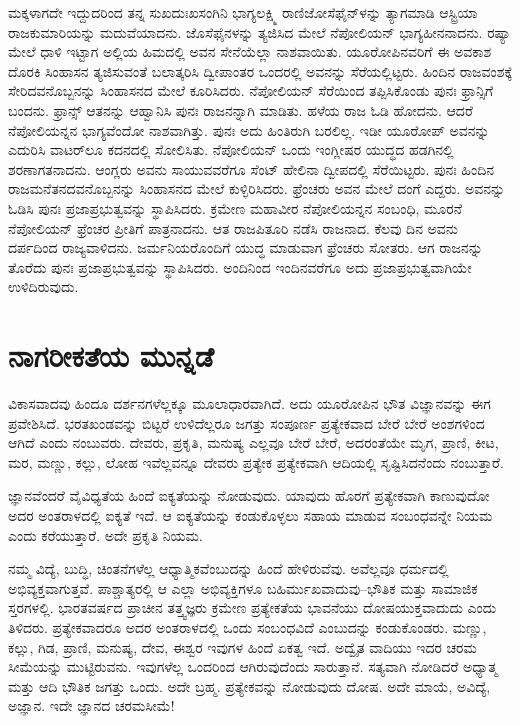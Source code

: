 ಮಕ್ಕಳಾಗದೇ ಇದ್ದುದರಿಂದ ತನ್ನ ಸುಖದುಃಖಸಂಗಿನಿ ಭಾಗ್ಯಲಕ್ಷ್ಮಿ ರಾಣಿ\break ಜೋಸೆಫೈನ್​ಳನ್ನು ತ್ಯಾಗಮಾಡಿ ಆಸ್ಟ್ರಿಯಾ ರಾಜಕುಮಾರಿಯನ್ನು ಮದುವೆಯಾದನು. ಜೊಸೆಫೈನಳನ್ನು ತ್ಯಜಿಸಿದ ಮೇಲೆ ನೆಪೋಲಿಯನ್​ ಭಾಗ್ಯಹೀನನಾದನು. ರಷ್ಯಾ ಮೇಲೆ ಧಾಳಿ ಇಟ್ಟಾಗ ಅಲ್ಲಿಯ ಹಿಮದಲ್ಲಿ ಅವನ ಸೇನೆಯೆಲ್ಲಾ ನಾಶವಾಯಿತು. ಯೂರೋಪಿ\break ನವರಿಗೆ ಈ ಅವಕಾಶ ದೊರಕಿ ಸಿಂಹಾಸನ ತ್ಯಜಿಸುವಂತೆ ಬಲಾತ್ಕರಿಸಿ ದ್ವೀಪಾಂತರ ಒಂದರಲ್ಲಿ ಅವನನ್ನು ಸೆರೆಯಲ್ಲಿಟ್ಟರು. ಹಿಂದಿನ ರಾಜವಂಶಕ್ಕೆ ಸೇರಿದವನೊಬ್ಬನನ್ನು ಸಿಂಹಾಸನದ ಮೇಲೆ ಕೂರಿಸಿದರು. ನೆಪೋಲಿಯನ್​ ಸೆರೆಯಿಂದ ತಪ್ಪಿಸಿಕೊಂಡು ಪುನಃ ಫ್ರಾನ್ಸಿಗೆ ಬಂದನು. ಫ್ರಾನ್ಸ್​ ಆತನನ್ನು ಆಹ್ವಾನಿಸಿ ಪುನಃ ರಾಜನನ್ನಾಗಿ ಮಾಡಿತು. ಹಳೆಯ ರಾಜ ಓಡಿ ಹೋದನು. ಆದರೆ ನೆಪೋಲಿಯನ್ನನ ಭಾಗ್ಯವೆಂದೋ ನಾಶವಾಗಿತ್ತು. ಪುನಃ ಅದು ಹಿಂತಿರುಗಿ ಬರಲಿಲ್ಲ. ಇಡೀ ಯೂರೋಪ್​ ಅವನನ್ನು ಎದುರಿಸಿ ವಾಟರ್​ಲೂ ಕದನದಲ್ಲಿ ಸೋಲಿಸಿತು. ನೆಪೋಲಿಯನ್​ ಒಂದು ಇಂಗ್ಲೀಷರ ಯುದ್ಧದ ಹಡಗಿನಲ್ಲಿ ಶರಣಾಗತನಾದನು. ಆಂಗ್ಲರು ಅವನು ಸಾಯುವವರೆಗೂ ಸೆಂಟ್​ ಹೇಲಿನಾ ದ್ವೀಪದಲ್ಲಿ ಸೆರೆಯಿಟ್ಟರು. ಪುನಃ ಹಿಂದಿನ ರಾಜಮನೆತನದವನೊಬ್ಬನನ್ನು ಸಿಂಹಾಸನದ ಮೇಲೆ ಕುಳ್ಳಿರಿಸಿ\break ದರು. ಫ್ರೆಂಚರು ಅವನ ಮೇಲೆ ದಂಗೆ ಎದ್ದರು. ಅವನನ್ನು ಓಡಿಸಿ ಪುನಃ ಪ್ರಜಾಪ್ರಭುತ್ವವನ್ನು ಸ್ಥಾಪಿಸಿದರು. ಕ್ರಮೇಣ ಮಹಾವೀರ ನೆಪೋಲಿಯನ್ನನ ಸಂಬಂಧಿ, ಮೂರನೆ ನೆಪೋಲಿಯನ್​ ಫ್ರೆಂಚರ ಪ್ರೀತಿಗೆ ಪಾತ್ರನಾದನು. ಆತ ರಾಜಪಿತೂರಿ ನಡೆಸಿ ರಾಜನಾದ. ಕೆಲವು ದಿನ ಅವನು ದರ್ಪದಿಂದ ರಾಜ್ಯವಾಳಿದನು. ಜರ್ಮನಿಯರೊಂದಿಗೆ ಯುದ್ಧ ಮಾಡುವಾಗ ಫ್ರೆಂಚರು ಸೋತರು. ಆಗ ರಾಜನನ್ನು ತೊರೆದು ಪುನಃ ಪ್ರಜಾಪ್ರಭುತ್ವವನ್ನು ಸ್ಥಾಪಿಸಿದರು. ಅಂದಿನಿಂದ ಇಂದಿನವರೆಗೂ ಅದು ಪ್ರಜಾಪ್ರಭುತ್ವವಾಗಿಯೇ ಉಳಿದಿರುವುದು.

\newpage

\section*{ನಾಗರೀಕತೆಯ ಮುನ್ನಡೆ}

ವಿಕಾಸವಾದವು ಹಿಂದೂ ದರ್ಶನಗಳೆಲ್ಲಕ್ಕೂ ಮೂಲಾಧಾರವಾಗಿದೆ. ಅದು ಯೂರೋಪಿನ ಭೌತ ವಿಜ್ಞಾನವನ್ನು ಈಗ ಪ್ರವೇಶಿಸಿದೆ. ಭರತಖಂಡವನ್ನು ಬಿಟ್ಟರೆ ಉಳಿದೆಲ್ಲರೂ ಜಗತ್ತು ಸಂಪೂರ್ಣ ಪ್ರತ್ಯೇಕವಾದ ಬೇರೆ ಬೇರೆ ಅಂಶಗಳಿಂದ ಆಗಿದೆ ಎಂದು ನಂಬುವರು. ದೇವರು, ಪ್ರಕೃತಿ, ಮನುಷ್ಯ ಎಲ್ಲವೂ ಬೇರೆ ಬೇರೆ, ಅದರಂತೆಯೇ ಮೃಗ, ಪ್ರಾಣಿ, ಕೀಟ, ಮರ, ಮಣ್ಣು, ಕಲ್ಲು, ಲೋಹ ಇವೆಲ್ಲವನ್ನೂ ದೇವರು ಪ್ರತ್ಯೇಕ ಪ್ರತ್ಯೇಕವಾಗಿ ಆದಿಯಲ್ಲಿ ಸೃಷ್ಟಿಸಿದನೆಂದು ನಂಬುತ್ತಾರೆ.

\vskip 5pt

ಜ್ಞಾನವೆಂದರೆ ವೈವಿಧ್ಯತೆಯ ಹಿಂದೆ ಐಕ್ಯತೆಯನ್ನು ನೋಡುವುದು. ಯಾವುದು ಹೊರಗೆ ಪ್ರತ್ಯೇಕವಾಗಿ ಕಾಣುವುದೋ ಅದರ ಅಂತರಾಳದಲ್ಲಿ ಐಕ್ಯತೆ ಇದೆ. ಆ ಐಕ್ಯತೆಯನ್ನು ಕಂಡುಕೊಳ್ಳಲು ಸಹಾಯ ಮಾಡುವ ಸಂಬಂಧವನ್ನೇ ನಿಯಮ ಎಂದು ಕರೆಯುತ್ತಾರೆ. ಅದೇ ಪ್ರಕೃತಿ ನಿಯಮ.

\vskip 5pt

ನಮ್ಮ ವಿದ್ಯೆ, ಬುದ್ಧಿ, ಚಿಂತನೆಗಳೆಲ್ಲ ಆಧ್ಯಾತ್ಮಿಕವೆಂಬುದನ್ನು ಹಿಂದೆ ಹೇಳಿರುವೆವು. ಅವೆಲ್ಲವೂ ಧರ್ಮದಲ್ಲಿ ಅಭಿವ್ಯಕ್ತವಾಗುತ್ತವೆ. ಪಾಶ್ಚಾತ್ಯರಲ್ಲಿ ಆ ಎಲ್ಲಾ ಅಭಿವ್ಯಕ್ತಿಗಳೂ ಬಹಿರ್ಮುಖವಾದುವು–ಭೌತಿಕ ಮತ್ತು ಸಾಮಾಜಿಕ ಸ್ತರಗಳಲ್ಲಿ. ಭಾರತವರ್ಷದ ಪ್ರಾಚೀನ ತತ್ತ್ವಜ್ಞರು ಕ್ರಮೇಣ ಪ್ರತ್ಯೇಕತೆಯ ಭಾವನೆಯು ದೋಷಯುಕ್ತವಾದುದು ಎಂದು ತಿಳಿದರು. ಪ್ರತ್ಯೇಕವಾದರೂ ಅದರ ಅಂತರಾಳದಲ್ಲಿ ಒಂದು ಸಂಬಂಧವಿದೆ ಎಂಬುದನ್ನು ಕಂಡುಕೊಂಡರು. ಮಣ್ಣು, ಕಲ್ಲು, ಗಿಡ, ಪ್ರಾಣಿ, ಮನುಷ್ಯ, ದೇವ, ಈಶ್ವರ ಇವುಗಳ ಹಿಂದೆ ಏಕತ್ವ ಇದೆ. ಅದ್ವೈತ ವಾದಿಯು ಇದರ ಚರಮ ಸೀಮೆಯನ್ನು ಮುಟ್ಟಿರುವನು. ಇವುಗಳೆಲ್ಲ ಒಂದರಿಂದ ಆಗಿರುವುದೆಂದು ಸಾರುತ್ತಾನೆ. ಸತ್ಯವಾಗಿ ನೋಡಿದರೆ ಅಧ್ಯಾತ್ಮ ಮತ್ತು ಆದಿ ಭೌತಿಕ ಜಗತ್ತು ಒಂದು. ಅದೇ ಬ್ರಹ್ಮ. ಪ್ರತ್ಯೇಕವನ್ನು ನೋಡುವುದು ದೋಷ. ಅದೇ ಮಾಯೆ, ಅವಿದ್ಯೆ, ಅಜ್ಞಾನ. ಇದೇ ಜ್ಞಾನದ ಚರಮಸೀಮೆ!

